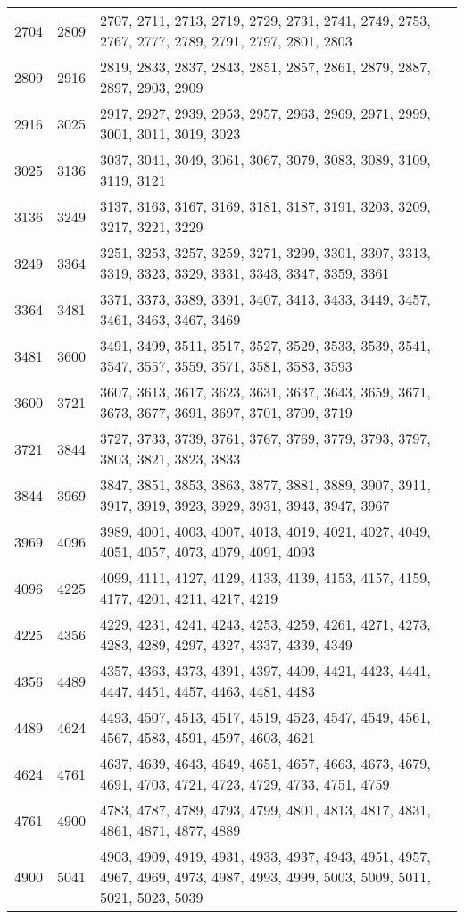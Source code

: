 \documentclass[12pt]{article}
\begin{document}
\begin{tabular}{|c|l|l|}
2704 & 2809 & 2707, 2711, 2713, 2719, 2729, 2731, 2741, 2749, 2753, 2767, 2777, 2789, 2791, 2797, 2801, 2803 \\
2809 & 2916 & 2819, 2833, 2837, 2843, 2851, 2857, 2861, 2879, 2887, 2897, 2903, 2909 \\
2916 & 3025 & 2917, 2927, 2939, 2953, 2957, 2963, 2969, 2971, 2999, 3001, 3011, 3019, 3023 \\
3025 & 3136 & 3037, 3041, 3049, 3061, 3067, 3079, 3083, 3089, 3109, 3119, 3121 \\
3136 & 3249 & 3137, 3163, 3167, 3169, 3181, 3187, 3191, 3203, 3209, 3217, 3221, 3229 \\
3249 & 3364 & 3251, 3253, 3257, 3259, 3271, 3299, 3301, 3307, 3313, 3319, 3323, 3329, 3331, 3343, 3347, 3359, 3361 \\
3364 & 3481 & 3371, 3373, 3389, 3391, 3407, 3413, 3433, 3449, 3457, 3461, 3463, 3467, 3469 \\
3481 & 3600 & 3491, 3499, 3511, 3517, 3527, 3529, 3533, 3539, 3541, 3547, 3557, 3559, 3571, 3581, 3583, 3593 \\
3600 & 3721 & 3607, 3613, 3617, 3623, 3631, 3637, 3643, 3659, 3671, 3673, 3677, 3691, 3697, 3701, 3709, 3719 \\
3721 & 3844 & 3727, 3733, 3739, 3761, 3767, 3769, 3779, 3793, 3797, 3803, 3821, 3823, 3833 \\
3844 & 3969 & 3847, 3851, 3853, 3863, 3877, 3881, 3889, 3907, 3911, 3917, 3919, 3923, 3929, 3931, 3943, 3947, 3967 \\
3969 & 4096 & 3989, 4001, 4003, 4007, 4013, 4019, 4021, 4027, 4049, 4051, 4057, 4073, 4079, 4091, 4093 \\
4096 & 4225 & 4099, 4111, 4127, 4129, 4133, 4139, 4153, 4157, 4159, 4177, 4201, 4211, 4217, 4219 \\
4225 & 4356 & 4229, 4231, 4241, 4243, 4253, 4259, 4261, 4271, 4273, 4283, 4289, 4297, 4327, 4337, 4339, 4349 \\
4356 & 4489 & 4357, 4363, 4373, 4391, 4397, 4409, 4421, 4423, 4441, 4447, 4451, 4457, 4463, 4481, 4483 \\
4489 & 4624 & 4493, 4507, 4513, 4517, 4519, 4523, 4547, 4549, 4561, 4567, 4583, 4591, 4597, 4603, 4621 \\
4624 & 4761 & 4637, 4639, 4643, 4649, 4651, 4657, 4663, 4673, 4679, 4691, 4703, 4721, 4723, 4729, 4733, 4751, 4759 \\
4761 & 4900 & 4783, 4787, 4789, 4793, 4799, 4801, 4813, 4817, 4831, 4861, 4871, 4877, 4889 \\
4900 & 5041 & 4903, 4909, 4919, 4931, 4933, 4937, 4943, 4951, 4957, 4967, 4969, 4973, 4987, 4993, 4999, 5003, 5009, 5011, 5021, 5023, 5039 \\

\end{tabular}
\end{document}
